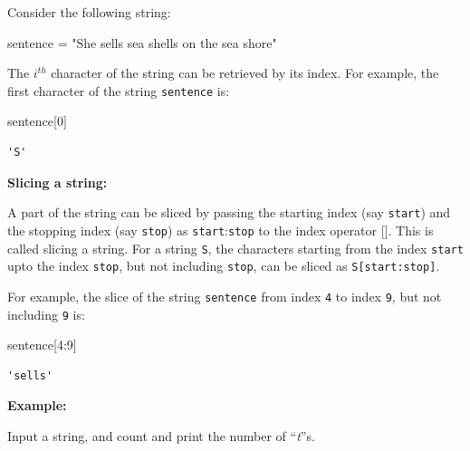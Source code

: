 \documentclass[
  letterpaper,
  DIV=11,
  numbers=noendperiod]{scrreprt}
\newenvironment{Shaded}{\begin{snugshade}}{\end{snugshade}}
\newcommand{\DecValTok}[1]{\textcolor[rgb]{0.68,0.00,0.00}{#1}}
\newcommand{\NormalTok}[1]{\textcolor[rgb]{0.00,0.23,0.31}{#1}}
\newcommand{\OperatorTok}[1]{\textcolor[rgb]{0.37,0.37,0.37}{#1}}
\newcommand{\StringTok}[1]{\textcolor[rgb]{0.13,0.47,0.30}{#1}}
\begin{document}
Consider the following string:

\begin{Shaded}
\begin{Highlighting}[]
\NormalTok{sentence }\OperatorTok{=} \StringTok{"She sells sea shells on the sea shore"}
\end{Highlighting}
\end{Shaded}

The \(i^{th}\) character of the string can be retrieved by its index.
For example, the first character of the string \texttt{sentence} is:

\begin{Shaded}
\begin{Highlighting}[]
\NormalTok{sentence[}\DecValTok{0}\NormalTok{]}
\end{Highlighting}
\end{Shaded}

\begin{verbatim}
'S'
\end{verbatim}

\textbf{Slicing a string:}

A part of the string can be sliced by passing the starting index (say
\texttt{start}) and the stopping index (say \texttt{stop}) as
\texttt{start}:\texttt{stop} to the index operator {[}{]}. This is
called slicing a string. For a string \texttt{S}, the characters
starting from the index \texttt{start} upto the index \texttt{stop}, but
not including \texttt{stop}, can be sliced as
\texttt{S{[}start:stop{]}}.

For example, the slice of the string \texttt{sentence} from index
\texttt{4} to index \texttt{9}, but not including \texttt{9} is:

\begin{Shaded}
\begin{Highlighting}[]
\NormalTok{sentence[}\DecValTok{4}\NormalTok{:}\DecValTok{9}\NormalTok{]}
\end{Highlighting}
\end{Shaded}

\begin{verbatim}
'sells'
\end{verbatim}

\textbf{Example:}

Input a string, and count and print the number of ``\emph{t}''s.
\end{document}
